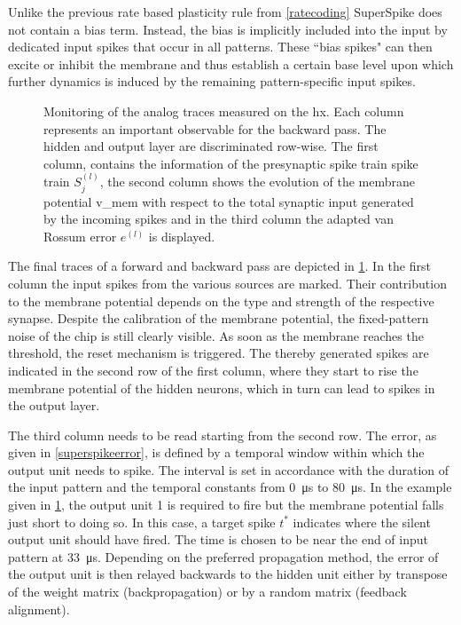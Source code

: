 Unlike the previous rate based plasticity rule from \cref{ratecoding} SuperSpike does not contain a bias term. Instead, the bias is implicitly included into the input by dedicated input spikes that occur in all patterns. These ``bias spikes" can then excite or inhibit the membrane and thus establish a certain base level upon which further dynamics is induced by the remaining pattern-specific input spikes.

\begin{figure}
	\centering
	
	\caption[Monitoring of the analog traces measured on the \gls{hx}.]{Monitoring of the analog traces measured on the \gls{hx}. Each column represents an important observable for the backward pass. The hidden and output layer are discriminated row-wise. The first column, contains the information of the presynaptic spike train spike train $S_j^{(l)}$, the second column shows the evolution of the membrane potential \gls{v_mem} with respect to the total synaptic input generated by the incoming spikes and in the third column the adapted van Rossum error $e^{(l)}$ is displayed.}
	\label{debugplot}
\end{figure}

The final traces of a forward and backward pass are depicted in \cref{debugplot}. In the first column the input spikes from the various sources are marked. Their contribution to the membrane potential depends on the type and strength of the respective synapse. Despite the calibration of the membrane potential, the fixed-pattern noise of the chip is still clearly visible. As soon as the membrane reaches the threshold, the reset mechanism is triggered. The thereby generated spikes are indicated in the second row of the first column, where they start to rise the membrane potential of the hidden neurons, which in turn can lead to spikes in the output layer.

The third column needs to be read starting from the second row. The error, as given in \cref{superspikeerror}, is defined by a temporal window within which the output unit needs to spike.
The interval is set in accordance with the duration of the input pattern and the temporal constants from \SI{0}{\micro \s} to \SI{80}{\micro \s}. In the example given in \cref{debugplot}, the output unit 1 is required to fire but the membrane potential falls just short to doing so. In this case, a target spike $t^*$ indicates where the silent output unit should have fired. The time is chosen to be near the end of input pattern at \SI{33}{\micro \s}. Depending on the preferred propagation method, the error of the output unit is then relayed backwards to the hidden unit either by transpose of the weight matrix (backpropagation) or by a random matrix (feedback alignment).

